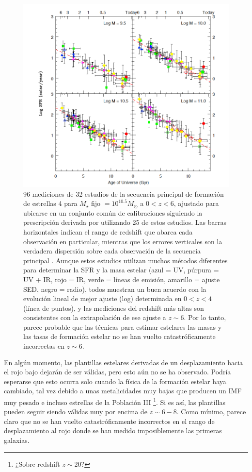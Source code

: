 \documentclass{article}
\begin{document}
\begin{figure}[t]
\begin{center}
\includegraphics[scale=0.55]{Figuras/steindhart_fig2}
\caption{\label{fig:steindhart_fig2} 96 mediciones de 32 estudios de la secuencia principal de formación de estrellas 4 para $M_\star$ fijo $= 10^{10.5}M_\odot$ a $0 <z <6$, ajustado para ubicarse en un conjunto común de calibraciones siguiendo la prescripción derivada por \cite{speagle2014highly} utilizando 25 de estos estudios. Las barras horizontales indican el rango de redshift que abarca cada observación en particular, mientras que los errores verticales son la verdadera dispersión sobre cada observación de la secuencia principal \citep{speagle2014highly}. Aunque estos estudios utilizan muchos métodos diferentes para determinar la SFR y la masa estelar (azul = UV, púrpura = UV + IR, rojo = IR, verde = líneas de emisión, amarillo = ajuste SED, negro = radio), todos muestran un buen acuerdo con  la evolución lineal de mejor ajuste (log) determinada en $0 <z <4$ (línea de puntos), y las mediciones del redshift más altas son consistentes con la extrapolación de ese ajuste a $z\sim 6$. Por lo tanto, parece probable que las técnicas para estimar estelares las masas y las tasas de formación estelar no se han vuelto catastróficamente incorrectas en $z\sim 6$.}
\end{center}
\end{figure}

En algún momento, las plantillas estelares derivadas de un desplazamiento hacia el rojo bajo dejarán de ser válidas, pero esto aún no se ha observado. Podría esperarse que esto ocurra solo cuando la física de la formación estelar haya cambiado, tal vez debido a unas metalicidades muy bajas que producen un IMF muy pesado e incluso estrellas de la Población III \footnote{¿Sobre redshift $z\sim 20$?}. Si es así, las plantillas pueden seguir siendo válidas muy por encima de $z\sim 6-8$. Como mínimo, parece claro que no se han vuelto catastróficamente incorrectos en el rango de desplazamiento al rojo donde se han medido imposiblemente las primeras galaxias.\\
\end{document}
